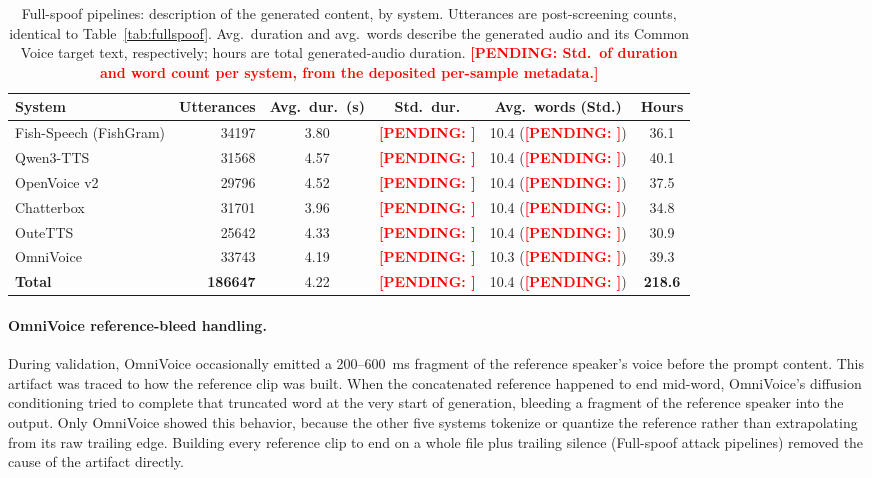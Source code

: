 \documentclass[11pt]{article}
\newcommand{\PENDING}[1]{\textcolor{red}{\textbf{[PENDING: #1]}}}
\begin{document}
\begin{table}[t]
\centering
\caption{Full-spoof pipelines: description of the generated content, by
system. Utterances are post-screening counts, identical to
Table~\ref{tab:fullspoof}. Avg.\ duration and avg.\ words describe the
generated audio and its Common Voice target text, respectively; hours
are total generated-audio duration. \PENDING{Std.\ of duration and word
count per system, from the deposited per-sample metadata.}}
\label{tab:fullspoofdesc}
\small
\begin{tabular}{lrcccc}
\toprule
\textbf{System} & \textbf{Utterances} & \textbf{Avg.\ dur.\ (s)} & \textbf{Std.\ dur.} & \textbf{Avg.\ words (Std.)} & \textbf{Hours} \\
\midrule
Fish-Speech (FishGram) & 34197 & 3.80 & \PENDING{} & 10.4 (\PENDING{}) & 36.1 \\
Qwen3-TTS              & 31568 & 4.57 & \PENDING{} & 10.4 (\PENDING{}) & 40.1 \\
OpenVoice v2           & 29796 & 4.52 & \PENDING{} & 10.4 (\PENDING{}) & 37.5 \\
Chatterbox             & 31701 & 3.96 & \PENDING{} & 10.4 (\PENDING{}) & 34.8 \\
OuteTTS                & 25642 & 4.33 & \PENDING{} & 10.4 (\PENDING{}) & 30.9 \\
OmniVoice              & 33743 & 4.19 & \PENDING{} & 10.3 (\PENDING{}) & 39.3 \\
\midrule
\textbf{Total}         & \textbf{186647} & 4.22 & \PENDING{} & 10.4 (\PENDING{}) & \textbf{218.6} \\
\bottomrule
\end{tabular}
\end{table}

\paragraph{OmniVoice reference-bleed handling.} During validation,
OmniVoice occasionally emitted a 200--\SI{600}{\milli\second} fragment of
the reference speaker's voice before the prompt content. This artifact
was traced to how the reference clip was built. When the concatenated
reference happened to end mid-word, OmniVoice's diffusion conditioning
tried to complete that truncated word at the very start of generation,
bleeding a fragment of the reference speaker into the output. Only
OmniVoice showed this behavior, because the other five systems tokenize
or quantize the reference rather than extrapolating from its raw
trailing edge. Building every reference clip to end on a whole file plus
trailing silence (Full-spoof attack pipelines) removed the cause of the
artifact directly.
\end{document}
